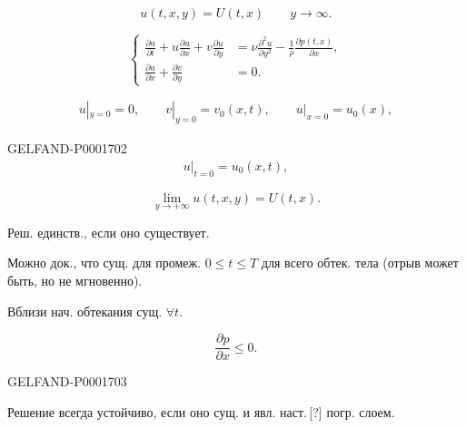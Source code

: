 \begin{equation*}u(t,x,y)=U(t,x)\qquad y\longrightarrow\infty.\end{equation*}


\begin{equation*}
\left\{\begin{aligned}
\frac{\partial u}{\partial t}+u\frac{\partial u}{\partial x}+v\frac{\partial u}{\partial y}&=\nu\frac{\partial^2u}{\partial y^2}-\frac1\rho\frac{\partial p(t,x)}{\partial x},\\
\frac{\partial u}{\partial x}+\frac{\partial v}{\partial y}&=0.
\end{aligned}\right.
\end{equation*}

\begin{gather*}
u|_{y=0}=0,\qquad v|_{y=0}=v_0(x,t),\qquad u|_{x=0}=u_0(x),
\end{gather*}

\begin{GelfandAdjacentEvidence}{GELFAND-P000170}{2}
\begin{gather*}
u|_{t=0}=u_0(x,t),
\end{gather*}
\end{GelfandAdjacentEvidence}

\begin{equation*}
\lim_{y\to+\infty}u(t,x,y)=U(t,x).
\end{equation*}


Реш. единств., если оно существует.

Можно док., что сущ. для промеж. $0\le t\le T$ для всего
обтек. тела (отрыв может быть, но не мгновенно).

Вблизи нач. обтекания сущ. $\forall t$.

\begin{equation*}\frac{\partial p}{\partial x}\le0.\end{equation*}

\begin{GelfandAdjacentEvidence}{GELFAND-P000170}{3}

Решение всегда устойчиво, если оно сущ. и явл. наст.\,[?]
погр. слоем.
\end{GelfandAdjacentEvidence}



